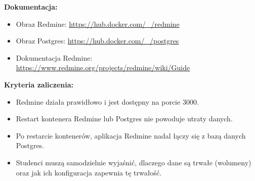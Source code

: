\documentclass{article}
\begin{document}
\textbf{Dokumentacja:}
\begin{itemize}
    \item Obraz Redmine: \url{https://hub.docker.com/_/redmine}
    \item Obraz Postgres: \url{https://hub.docker.com/_/postgres}
    \item Dokumentacja Redmine: \url{https://www.redmine.org/projects/redmine/wiki/Guide}
\end{itemize}

\textbf{Kryteria zaliczenia:}
\begin{itemize}
    \item Redmine działa prawidłowo i jest dostępny na porcie 3000.
    \item Restart kontenera Redmine lub Postgres nie powoduje utraty danych.
    \item Po restarcie kontenerów, aplikacja Redmine nadal łączy się z bazą danych Postgres.
    \item Studenci muszą samodzielnie wyjaśnić, dlaczego dane są trwałe (wolumeny) oraz jak ich konfiguracja zapewnia tę trwałość.
\end{itemize}
\end{document}
